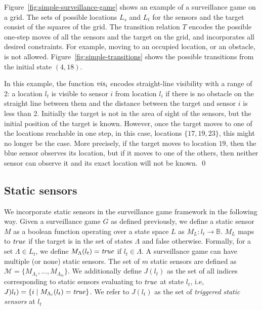 \begin{example}\label{ex:simple-surveillance-game}
Figure~\ref{fig:simple-surveillance-game} shows an example of a surveillance game on a grid.  The sets of possible locations $L_s$ and $L_t$ for the sensors and the target consist of the squares of the  grid. The transition relation $T$ encodes the possible one-step moves of all the sensors and the target on the grid, and incorporates all desired constraints. For example, moving to an occupied location, or an obstacle, is not allowed. Figure~\ref{fig:simple-transitions} shows the possible transitions from the initial state $(4,18)$.

In this example, the function $\mathit{vis}_i$ encodes straight-line visibility with a range of 2: a location $l_t$ is visible to sensor $i$ from location $l_i$ if there is no obstacle on the straight line between them and the distance between the target and sensor $i$ is less than 2. Initially the target is not in the area of sight of the sensors, but the initial position of the target is known. However, once the target moves to one of the locations reachable in one step, in this case, locations $\{17,19,23\}$, this might no longer be the case. More precisely, if the target moves to location $19$, then the blue sensor observes its location, but if it moves to one of the others, then neither sensor can observe it and its exact location will not be known. \qed
\end{example}


\subsection{Static sensors}
We incorporate static sensors in the surveillance game framework in the following way. Given a surveillance game $G$ as defined previously, we define a static sensor $M$ as a boolean function operating over a state space $L$ as $M_{L} : l_t \rightarrow \mathbb{B}$. $M_L$ maps to $\mathit{true}$ if the target is in the set of states $\Lambda$ and false otherwise. Formally, for a set $\Lambda \in L_t$, we define $M_{\Lambda}(l_t) = \mathit{true}$ if $l_t \in \Lambda$. A surveillance game can have multiple (or none) static sensors. The set of $m$ static sensors are defined as $\mathcal{M} = \{M_{\Lambda_1},\dots,M_{\Lambda_m}\}$. We additionally define $J(l_t)$ as the set of all indices corresponding to static sensors evaluating to $\mathit{true}$ at state $l_t$, i.e, $J)l_t) = \{i \mid M_{\Lambda_i}(l_t) = \mathit{true}\}$. We refer to $J(l_t)$ as the set of \emph{triggered static sensors} at $l_t$

